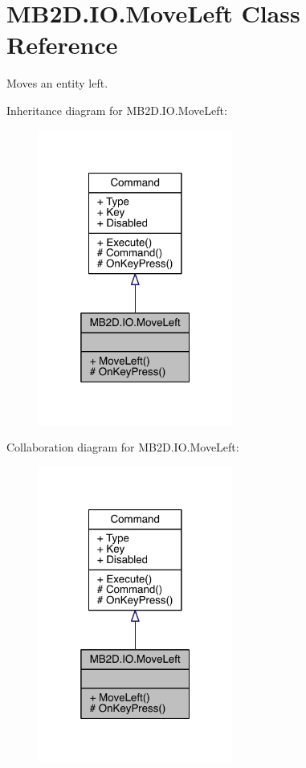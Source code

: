\hypertarget{class_m_b2_d_1_1_i_o_1_1_move_left}{}\section{M\+B2\+D.\+I\+O.\+Move\+Left Class Reference}
\label{class_m_b2_d_1_1_i_o_1_1_move_left}


Moves an entity left.  




Inheritance diagram for M\+B2\+D.\+I\+O.\+Move\+Left\+:\nopagebreak
\begin{figure}[H]
\begin{center}
\leavevmode
\includegraphics[width=181pt]{class_m_b2_d_1_1_i_o_1_1_move_left__inherit__graph}
\end{center}
\end{figure}


Collaboration diagram for M\+B2\+D.\+I\+O.\+Move\+Left\+:\nopagebreak
\begin{figure}[H]
\begin{center}
\leavevmode
\includegraphics[width=181pt]{class_m_b2_d_1_1_i_o_1_1_move_left__coll__graph}
\end{center}
\end{figure}
